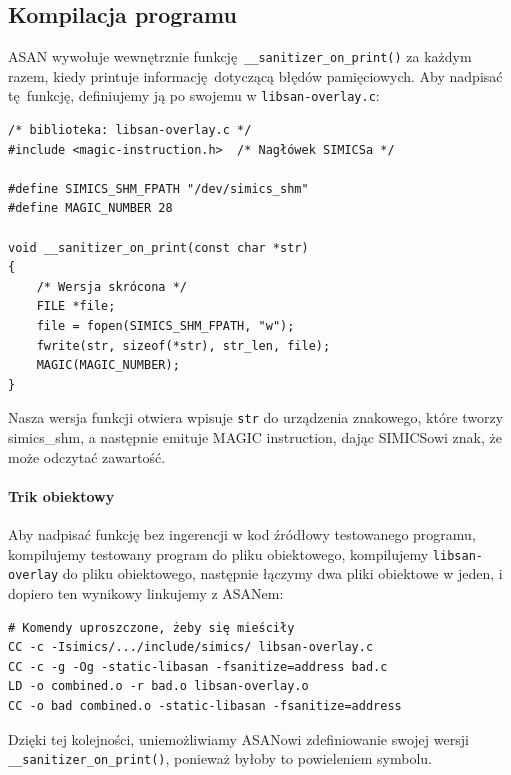 \documentclass[../main.tex]{subfiles}
\begin{document}
\subsection{Kompilacja programu}

ASAN wywołuje wewnętrznie funkcję \texttt{__sanitizer_on_print()} za
każdym razem, kiedy printuje informację dotyczącą błędów pamięciowych. Aby
nadpisać tę funkcję, definiujemy ją po swojemu w
\texttt{libsan-overlay.c}:

	\begin{listing}[H]
	\begin{verbatim}
/* biblioteka: libsan-overlay.c */
#include <magic-instruction.h>  /* Nagłówek SIMICSa */

#define SIMICS_SHM_FPATH "/dev/simics_shm"
#define MAGIC_NUMBER 28

void __sanitizer_on_print(const char *str)
{
	/* Wersja skrócona */
	FILE *file;
	file = fopen(SIMICS_SHM_FPATH, "w");
	fwrite(str, sizeof(*str), str_len, file);
	MAGIC(MAGIC_NUMBER);
}
	\end{verbatim}
\end{listing}
\noindent
Nasza wersja funkcji otwiera wpisuje \texttt{str} do urządzenia
znakowego, które tworzy simics\_shm, a następnie emituje MAGIC instruction,
dając SIMICSowi znak, że może odczytać zawartość.

\paragraph{Trik obiektowy} Aby nadpisać funkcję bez ingerencji w kod źródłowy
testowanego programu, kompilujemy testowany program do pliku obiektowego,
kompilujemy \texttt{libsan-overlay} do pliku obiektowego, następnie
łączymy dwa pliki obiektowe w jeden, i dopiero ten wynikowy linkujemy z ASANem:

	\begin{listing}[H]
	\begin{verbatim}
# Komendy uproszczone, żeby się mieściły
CC -c -Isimics/.../include/simics/ libsan-overlay.c
CC -c -g -Og -static-libasan -fsanitize=address bad.c
LD -o combined.o -r bad.o libsan-overlay.o
CC -o bad combined.o -static-libasan -fsanitize=address
	\end{verbatim}
\end{listing}
\noindent
Dzięki tej kolejności, uniemożliwiamy ASANowi zdefiniowanie swojej wersji \\
\texttt{__sanitizer_on_print()}, ponieważ byłoby to powieleniem symbolu.
\end{document}
